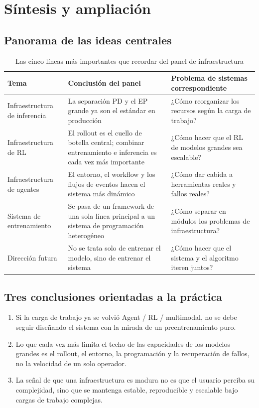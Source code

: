 \section{Síntesis y ampliación}

\subsection{Panorama de las ideas centrales}
\begin{table}[H]
\centering
\begin{tabular}{p{2.8cm}p{4.0cm}p{5.0cm}}
\toprule
\textbf{Tema} & \textbf{Conclusión del panel} & \textbf{Problema de sistemas correspondiente} \\
\midrule
Infraestructura de inferencia & La separación PD y el EP grande ya son el estándar en producción & ¿Cómo reorganizar los recursos según la carga de trabajo? \\
Infraestructura de RL & El rollout es el cuello de botella central; combinar entrenamiento e inferencia es cada vez más importante & ¿Cómo hacer que el RL de modelos grandes sea escalable? \\
Infraestructura de agentes & El entorno, el workflow y los flujos de eventos hacen el sistema más dinámico & ¿Cómo dar cabida a herramientas reales y fallos reales? \\
Sistema de entrenamiento & Se pasa de un framework de una sola línea principal a un sistema de programación heterogéneo & ¿Cómo separar en módulos los problemas de infraestructura? \\
Dirección futura & No se trata solo de entrenar el modelo, sino de entrenar el sistema & ¿Cómo hacer que el sistema y el algoritmo iteren juntos? \\
\bottomrule
\end{tabular}
\caption{Las cinco líneas más importantes que recordar del panel de infraestructura}
\end{table}

\subsection{Tres conclusiones orientadas a la práctica}
\begin{enumerate}
  \item Si la carga de trabajo ya se volvió Agent / RL / multimodal, no se debe seguir diseñando el sistema con la mirada de un preentrenamiento puro.
  \item Lo que cada vez más limita el techo de las capacidades de los modelos grandes es el rollout, el entorno, la programación y la recuperación de fallos, no la velocidad de un solo operador.
  \item La señal de que una infraestructura es madura no es que el usuario perciba su complejidad, sino que se mantenga estable, reproducible y escalable bajo cargas de trabajo complejas.
\end{enumerate}


